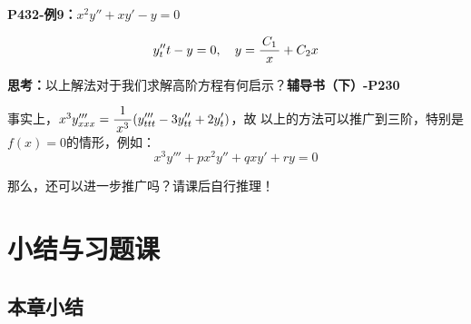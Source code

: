 {\bf P432-例9：}$x^2y''+xy'-y=0$

$$y''_tt-y=0,\quad y=\displaystyle\frac{\,{C_1}\,}{\,{x}\,}+C_2x$$

{\bf 思考：}以上解法对于我们求解高阶方程有何启示？\hfill{\bf 辅导书（下）-P230}

事实上，$x^3y'''_{xxx}=\displaystyle\frac{\,{1}\,}{\,{x^3}\,}(y'''_{ttt}-3y''_{tt}+2y'_t)$，故
以上的方法可以推广到三阶，特别是$f(x)=0$的情形，例如：
$$x^3y'''+px^2y''+qxy'+ry=0$$

那么，还可以进一步推广吗？请课后自行推理！

\section{小结与习题课}

\subsection{本章小结}

